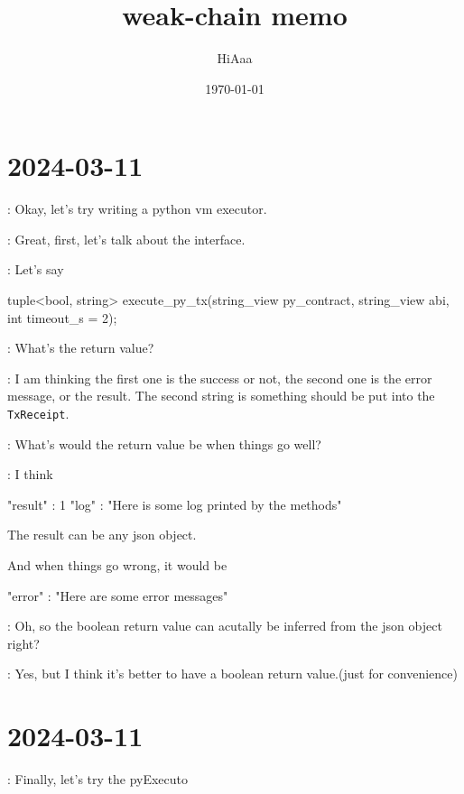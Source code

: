 \documentclass[dvipsnames]{article}
\title{weak-chain memo}
\date{\today}
\author{HiAaa}
\begin{document}
\maketitle
\tableofcontents{}
\newpage{}

% 
% 
% 
% 

\section*{2024-03-11}

 :  Okay, let's try writing a python vm executor.

 : Great, first, let's talk about the interface.

 : Let's say

\begin{simplec}
tuple<bool, string> execute_py_tx(string_view py_contract, string_view abi, int timeout_s = 2);
\end{simplec}

 : What's the return value?

 : I am thinking the first one is the success or not, the second
one is the error message, or the result. The second string is something should
be put into the \texttt{TxReceipt}.

 : What's would the return value be when things go well?

 : I think

\begin{simplejs}
{
    "result" : 1
    "log" : "Here is some log printed by the methods"
}
\end{simplejs}

The result can be any json object.

And when things go wrong, it would be
\begin{simplejs}
{
    "error" : "Here are some error messages"
}
\end{simplejs}

 : Oh, so the boolean return value can acutally be inferred from
the json object right?

 : Yes, but I think it's better to have a boolean return
value.(just for convenience)

\section*{2024-03-11}

 : Finally, let's try the pyExecuto
\end{document}
